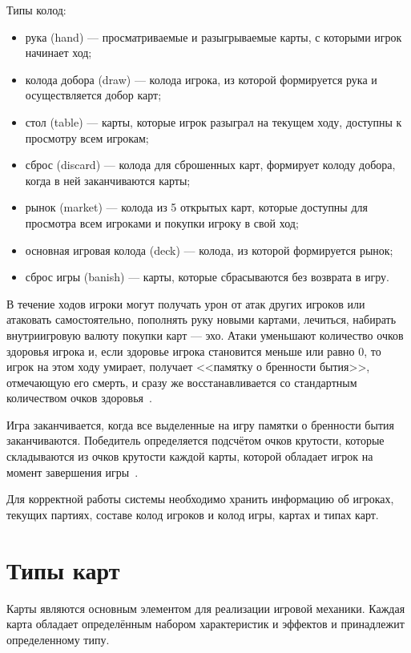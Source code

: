 Типы колод:
\begin{itemize}
	\item рука (hand) --- просматриваемые и разыгрываемые карты, с которыми
	      игрок начинает ход;
	\item колода добора (draw) --- колода игрока, из которой формируется
	      рука и осуществляется добор карт;
	\item стол (table) --- карты, которые игрок разыграл на текущем ходу,
	      доступны к просмотру всем игрокам;
	\item сброс (discard) --- колода для сброшенных карт, формирует колоду
	      добора, когда в ней заканчиваются карты;
	\item рынок (market) --- колода из 5 открытых карт, которые доступны
	      для просмотра всем игроками и покупки игроку в свой ход;
	\item основная игровая колода (deck) --- колода, из которой формируется
	      рынок;
	\item сброс игры (banish) --- карты, которые сбрасываются без возврата
	      в игру.
\end{itemize}

В течение ходов игроки могут получать урон от атак других игроков или атаковать
самостоятельно, пополнять руку новыми картами, лечиться, набирать внутриигровую
валюту покупки карт --- эхо. Атаки уменьшают количество очков здоровья игрока
и, если здоровье игрока становится меньше или равно 0, то игрок на этом ходу
умирает, получает <<памятку о бренности бытия>>, отмечающую его смерть, и сразу
же восстанавливается со стандартным количеством очков здоровья~\cite{rules}.

Игра заканчивается, когда все выделенные на игру памятки о бренности бытия
заканчиваются. Победитель определяется подсчётом очков крутости, которые
складываются из очков крутости каждой карты, которой обладает игрок на момент
завершения игры~\cite{rules}.

Для корректной работы системы необходимо хранить информацию об игроках, текущих
партиях, составе колод игроков и колод игры, картах и типах карт.

\section{Типы карт}
Карты являются основным элементом для реализации игровой механики. Каждая карта
обладает определённым набором характеристик и эффектов и принадлежит
определенному типу.

